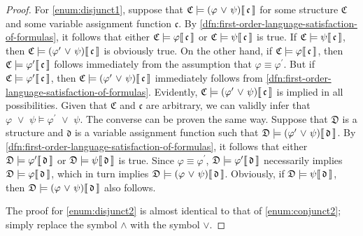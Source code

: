 \begin{proof}
    \vspace{0.3cm}
    \noindent
    For \ref{enum:disjunct1}, suppose that \( \folwffsatisfaction{\mathfrak{C}}{\mleft( \varphi \,\,{\lor}\,\, \psi \mright)}{\mathfrak{c}} \) for some structure
    \( \mathfrak{C} \) and some variable assignment function \( \mathfrak{c} \).
    By \cref{dfn:first-order-language-satisfaction-of-formulas}, it follows that either \(  \mathfrak{C} \models \varphi\llbracket\, \mathfrak{c} \,\rrbracket \)
    or \(  \mathfrak{C} \models \psi\llbracket\, \mathfrak{c} \,\rrbracket \) is true.
    If \(  \mathfrak{C} \models \psi\llbracket\, \mathfrak{c} \,\rrbracket \), then \( \folwffsatisfaction{\mathfrak{C}}{\mleft( \varphi^{\prime} \,\,{\lor}\,\, \psi \mright)}{\mathfrak{c}} \) is obviously true.
    On the other hand, if \(  \mathfrak{C} \models \varphi\llbracket\, \mathfrak{c} \,\rrbracket \), then \(  \mathfrak{C} \models \varphi^{\prime}\llbracket\, \mathfrak{c} \,\rrbracket \)
    follows immediately from the assumption that \( \varphi \equiv \varphi^{\prime} \). But if \(  \mathfrak{C} \models \varphi^{\prime}\llbracket\, \mathfrak{c} \,\rrbracket \),
    then \( \folwffsatisfaction{\mathfrak{C}}{\mleft( \varphi^{\prime} \,\,{\lor}\,\, \psi \mright)}{\mathfrak{c}} \) immediately follows from
    \cref{dfn:first-order-language-satisfaction-of-formulas}. Evidently, \( \folwffsatisfaction{\mathfrak{C}}{\mleft( \varphi^{\prime} \,\,{\lor}\,\, \psi \mright)}{\mathfrak{c}} \) is implied in all possibilities.
    Given that \( \mathfrak{C} \) and \( \mathfrak{c} \) are arbitrary, we can validly infer that \( \varphi \,\,{\lor}\,\, \psi \models \varphi^{\prime} \,\,{\lor}\,\, \psi \).
    The converse can be proven the same way.
    Suppose that \( \mathfrak{D} \) is a structure and \( \mathfrak{d} \) is a variable assignment function such that
    \( \folwffsatisfaction{\mathfrak{D}}{\mleft(\varphi^{\prime} \,\,{\lor}\,\, \psi\mright)}{\mathfrak{d}} \).
    By \cref{dfn:first-order-language-satisfaction-of-formulas}, it follows that either \(  \mathfrak{D} \models \varphi^{\prime}\llbracket\, \mathfrak{d} \,\rrbracket \)
    or \(  \mathfrak{D} \models \psi\llbracket\, \mathfrak{d} \,\rrbracket \) is true.
    Since \( \varphi \equiv \varphi^{\prime} \), \(  \mathfrak{D} \models \varphi^{\prime}\llbracket\, \mathfrak{d} \,\rrbracket \) necessarily implies
    \(  \mathfrak{D} \models \varphi\llbracket\, \mathfrak{d} \,\rrbracket \), which in turn implies \( \folwffsatisfaction{\mathfrak{D}}{\mleft( \varphi \,\,{\lor}\,\, \psi \mright)}{\mathfrak{d}} \).
    Obviously, if \(  \mathfrak{D} \models \psi\llbracket\, \mathfrak{d} \,\rrbracket \), then \( \folwffsatisfaction{\mathfrak{D}}{\mleft( \varphi \,\,{\lor}\,\, \psi \mright)}{\mathfrak{d}} \) also follows.

    \vspace{0.3cm}
    \noindent
    The proof for \ref{enum:disjunct2} is almost identical to that of \ref{enum:conjunct2}; simply replace the symbol \( \land  \) with the symbol \( \lor  \).
\end{proof}


